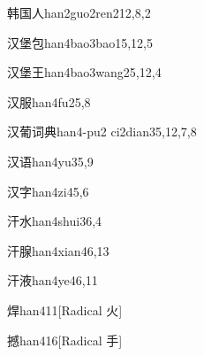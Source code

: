 \begin{verbete}{韩国人}{han2guo2ren2}{12,8,2}
\end{verbete}

\begin{verbete}{汉堡包}{han4bao3bao1}{5,12,5}
\end{verbete}

\begin{verbete}{汉堡王}{han4bao3wang2}{5,12,4}
\end{verbete}

\begin{verbete}{汉服}{han4fu2}{5,8}
\end{verbete}

\begin{verbete}{汉葡词典}{han4-pu2 ci2dian3}{5,12,7,8}
\end{verbete}

\begin{verbete}{汉语}{han4yu3}{5,9}
\end{verbete}

\begin{verbete}{汉字}{han4zi4}{5,6}
\end{verbete}

\begin{verbete}{汗水}{han4shui3}{6,4}
\end{verbete}

\begin{verbete}{汗腺}{han4xian4}{6,13}
\end{verbete}

\begin{verbete}{汗液}{han4ye4}{6,11}
\end{verbete}

\begin{verbete}{焊}{han4}{11}[Radical 火]
\end{verbete}

\begin{verbete}{撼}{han4}{16}[Radical 手]
\end{verbete}

